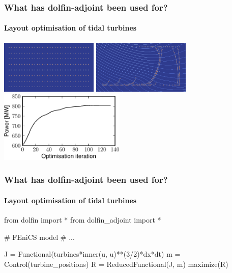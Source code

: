 \begin{frame}
    \frametitle{What has dolfin-adjoint been used for?}
    \framesubtitle{Layout optimisation of tidal turbines}
    \begin{center}
        \includegraphics[width=0.35\textwidth]{png/turbine0}
        \hspace{1cm}
        \includegraphics[width=0.35\textwidth]{png/streamlines_zoomed} \\
        \vspace{1cm}
        \includegraphics[width=0.45\textwidth]{pdf/OpenTidalFarm_iterplot}
    \end{center}
\end{frame}

\begin{frame}[fragile]
    \frametitle{What has dolfin-adjoint been used for?}
    \framesubtitle{Layout optimisation of tidal turbines}
\begin{python}
from dolfin import *
from dolfin_adjoint import *

# FEniCS model
# ...

J = Functional(turbines*inner(u, u)**(3/2)*dx*dt)
m = Control(turbine_positions)
R = ReducedFunctional(J, m)
maximize(R)
\end{python}

\end{frame}


